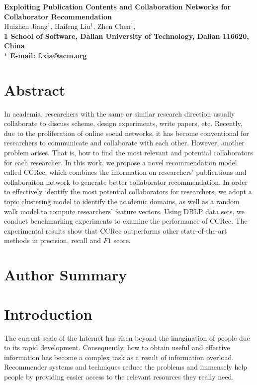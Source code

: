 \documentclass[10pt]{article}
\date{}
\begin{document}
\linenumbers

\begin{flushleft}
{\Large
\textbf{Exploiting Publication Contents and Collaboration Networks for Collaborator Recommendation}
}
\\
Huizhen Jiang$^{1}$,
Haifeng Liu$^{1}$,
Zhen Chen$^{1}$,
\\
\bf{1} School of Software, Dalian University of Technology, Dalian 116620, China
\\
$\ast$ E-mail: f.xia@acm.org
\end{flushleft}

\section*{Abstract}
In academia, researchers with the same or similar research direction usually collaborate to discuss scheme, design experiments, write papers, etc. Recently, due to the proliferation of online social networks, it has become conventional for researchers to communicate and collaborate with each other. However, another problem arises. That is, how to find the most relevant and potential collaborators for each researcher. In this work, we propose a novel recommendation model called CCRec, which combines the information on researchers' publications and collaboraiton network to generate better collaborator recommendation. In order to effectively identify the most potential collaborators for researchers, we adopt a topic clustering model to identify the academic domains, as well as a random walk model to compute researchers' feature vectors. Using DBLP data sets, we conduct benchmarking experiments to examine the performance of CCRec. The experimental results show that CCRec outperforms other state-of-the-art methods in precision, recall and $F1$ score.

\section*{Author Summary}


\section*{Introduction}
The current scale of the Internet has risen beyond the imagination of people due to its rapid development. Consequently, how to obtain useful and effective information has become a complex task as a result of information overload. Recommender systems and techniques reduce the problems and immensely help people by providing easier access to the relevant resources they really need.
\end{document}
